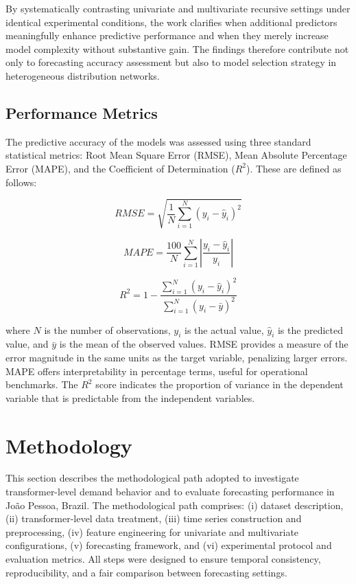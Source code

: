 By systematically contrasting univariate and multivariate recursive settings under identical experimental conditions, the work clarifies when additional predictors meaningfully enhance predictive performance and when they merely increase model complexity without substantive gain. The findings therefore contribute not only to forecasting accuracy assessment but also to model selection strategy in heterogeneous distribution networks.

\subsection{Performance Metrics}
The predictive accuracy of the models was assessed using three standard statistical metrics: Root Mean Square Error (RMSE), Mean Absolute Percentage Error (MAPE), and the Coefficient of Determination ($R^2$). These are defined as follows:

\begin{equation}
RMSE = \sqrt{\frac{1}{N} \sum_{i=1}^{N} (y_i - \hat{y}_i)^2}
\end{equation}

\begin{equation}
MAPE = \frac{100}{N} \sum_{i=1}^{N} \left| \frac{y_i - \hat{y}_i}{y_i} \right|
\end{equation}

\begin{equation}
R^2 = 1 - \frac{\sum_{i=1}^{N} (y_i - \hat{y}_i)^2}{\sum_{i=1}^{N} (y_i - \bar{y})^2}
\end{equation}

\noindent where $N$ is the number of observations, $y_i$ is the actual value, $\hat{y}_i$ is the predicted value, and $\bar{y}$ is the mean of the observed values. RMSE provides a measure of the error magnitude in the same units as the target variable, penalizing larger errors. MAPE offers interpretability in percentage terms, useful for operational benchmarks. The $R^2$ score indicates the proportion of variance in the dependent variable that is predictable from the independent variables.

\section{Methodology}
\label{sec:methodology}

This section describes the methodological path adopted to investigate transformer-level demand behavior and to evaluate forecasting performance in João Pessoa, Brazil. The methodological path comprises: (i) dataset description, (ii) transformer-level data treatment, (iii) time series construction and preprocessing, (iv) feature engineering for univariate and multivariate configurations, (v) forecasting framework, and (vi) experimental protocol and evaluation metrics. All steps were designed to ensure temporal consistency, reproducibility, and a fair comparison between forecasting settings.

